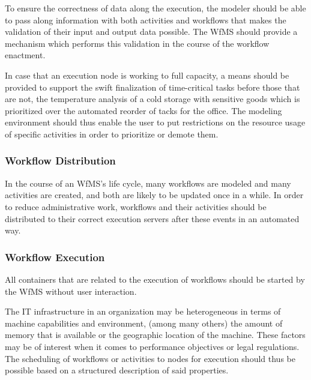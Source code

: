       To ensure the correctness of data along the execution, the modeler should be able to pass along information with both activities and workflows that makes the validation of their input and output data possible. The \ac{WfMS} should provide a mechanism which performs this validation in the course of the workflow enactment.

      In case that an execution node is working to full capacity, a means should be provided to support the swift finalization of time-critical tasks before those that are not, \eg the temperature analysis of a cold storage with sensitive goods which is prioritized over the automated reorder of tacks for the office. The modeling environment should thus enable the user to put restrictions on the resource usage of specific activities in order to prioritize or demote them.


  \subsubsection{Workflow Distribution} %
    \label{ssub:workflow_distribution}
      In the course of an \ac{WfMS}'s life cycle, many workflows are modeled and many activities are created, and both are likely to be updated once in a while. In order to reduce administrative work, workflows and their activities should be distributed to their correct execution servers after these events in an automated way.


  \subsubsection{Workflow Execution} %
    \label{ssub:workflow_execution}
        All containers that are related to the execution of workflows should be started by the \ac{WfMS} without user interaction.

        The IT infrastructure in an organization may be heterogeneous in terms of machine capabilities and environment, \eg (among many others) the amount of memory that is available or the geographic location of the machine. These factors may be of interest when it comes to performance objectives or legal regulations. The scheduling of workflows or activities to nodes for execution should thus be possible based on a structured description of said properties.

